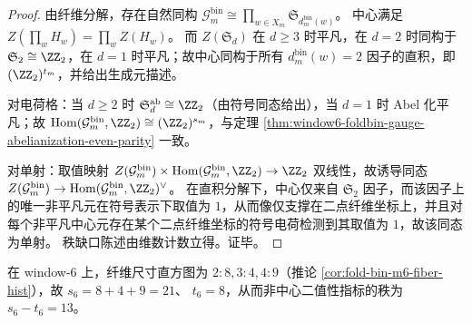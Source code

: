 \begin{proof}
由纤维分解，存在自然同构
\(
\mathcal{G}^{\mathrm{bin}}_m\cong \prod_{w\in X_m}\mathfrak S_{d^{\mathrm{bin}}_m(w)}
\)。
中心满足
\(
Z(\prod_w H_w)=\prod_w Z(H_w)
\)。
而 \(Z(\mathfrak S_d)\) 在 \(d\ge 3\) 时平凡，在 \(d=2\) 时同构于 \(\mathfrak S_2\cong\ZZ_2\)，在 \(d=1\) 时平凡；故中心同构于所有 \(d^{\mathrm{bin}}_m(w)=2\) 因子的直积，即 \((\ZZ_2)^{t_m}\)，并给出生成元描述。
\par
对电荷格：当 \(d\ge 2\) 时 \(\mathfrak S_d^{\mathrm{ab}}\cong\ZZ_2\)（由符号同态给出），当 \(d=1\) 时 Abel 化平凡；故
\(
\mathrm{Hom}(\mathcal{G}^{\mathrm{bin}}_m,\ZZ_2)\cong (\ZZ_2)^{s_m}
\)，与定理 \ref{thm:window6-foldbin-gauge-abelianization-even-parity} 一致。
\par
对单射：取值映射
\(
Z(\mathcal{G}^{\mathrm{bin}}_m)\times \mathrm{Hom}(\mathcal{G}^{\mathrm{bin}}_m,\ZZ_2)\to \ZZ_2
\)
双线性，故诱导同态
\(
Z(\mathcal{G}^{\mathrm{bin}}_m)\to \mathrm{Hom}(\mathcal{G}^{\mathrm{bin}}_m,\ZZ_2)^\vee
\)。
在直积分解下，中心仅来自 \(\mathfrak S_2\) 因子，而该因子上的唯一非平凡元在符号表示下取值为 \(1\)，从而像仅支撑在二点纤维坐标上，并且对每个非平凡中心元存在某个二点纤维坐标的符号电荷检测到其取值为 \(1\)，故该同态为单射。
秩缺口陈述由维数计数立得。证毕。
\end{proof}

\begin{remark}\label{rem:window6-foldbin-noncentral-binary-rank-gap}
在 window-\(6\) 上，纤维尺寸直方图为 \(2:8,3:4,4:9\)（推论 \ref{cor:fold-bin-m6-fiber-hist}），故
\(
s_6=8+4+9=21
\)、
\(
t_6=8
\)，从而非中心二值性指标的秩为 \(s_6-t_6=13\)。
\end{remark}

